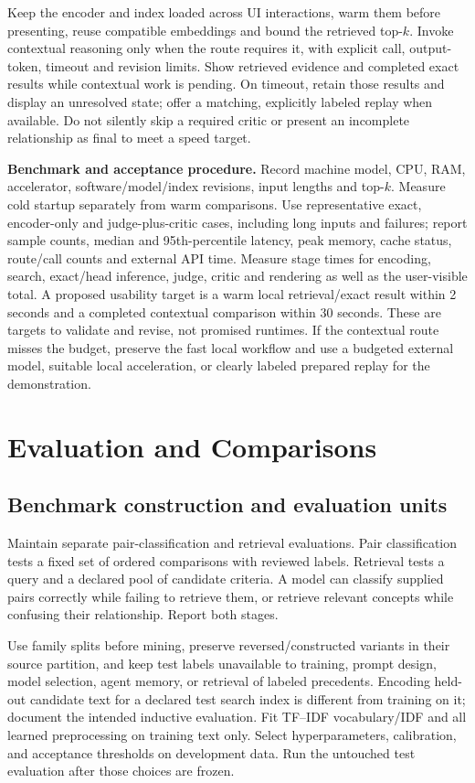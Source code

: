 \documentclass[10pt,letterpaper]{article}
\begin{document}
Keep the encoder and index loaded across UI interactions, warm them before
presenting, reuse compatible embeddings and bound the retrieved top-$k$.
Invoke contextual reasoning only when the route requires it, with explicit
call, output-token, timeout and revision limits. Show retrieved evidence and
completed exact results while contextual work is pending. On timeout, retain
those results and display an unresolved state; offer a matching, explicitly
labeled replay when available. Do not silently skip a required critic or
present an incomplete relationship as final to meet a speed target.

\textbf{Benchmark and acceptance procedure.} Record machine model, CPU,
RAM, accelerator, software/model/index revisions, input lengths and top-$k$.
Measure cold startup separately from warm comparisons. Use representative
exact, encoder-only and judge-plus-critic cases, including long inputs and
failures; report sample counts, median and 95th-percentile latency, peak
memory, cache status, route/call counts and external API time. Measure stage
times for encoding, search, exact/head inference, judge, critic and rendering
as well as the user-visible total. A proposed usability target is a warm
local retrieval/exact result within 2 seconds and a completed contextual
comparison within 30 seconds. These are targets to validate and revise,
not promised runtimes. If the contextual route misses the budget, preserve
the fast local workflow and use a budgeted external model, suitable local
acceleration, or clearly labeled prepared replay for the demonstration.

\section{Evaluation and Comparisons}
\label{sec:eval}

\subsection{Benchmark construction and evaluation units}
Maintain separate pair-classification and retrieval evaluations. Pair
classification tests a fixed set of ordered comparisons with reviewed labels.
Retrieval tests a query and a declared pool of candidate criteria. A model can
classify supplied pairs correctly while failing to retrieve them, or retrieve
relevant concepts while confusing their relationship. Report both stages.

Use family splits before mining, preserve reversed/constructed variants in
their source partition, and keep test labels unavailable to training,
prompt design, model selection, agent memory, or retrieval of labeled
precedents. Encoding held-out candidate text for a declared test search index
is different from training on it; document the intended inductive evaluation.
Fit TF--IDF vocabulary/IDF and all learned preprocessing on training text only.
Select hyperparameters, calibration, and acceptance thresholds on development
data. Run the untouched test evaluation after those choices are frozen.
\end{document}
